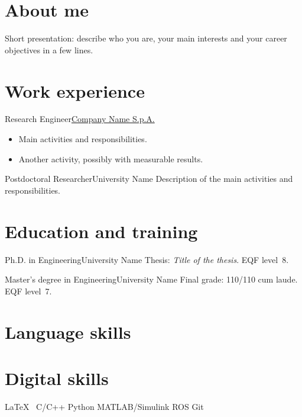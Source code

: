 \documentclass[english,a4paper,10pt]{europecv2020}
\begin{document}
\ecvpersonalinfo

\section{About me}
Short presentation: describe who you are, your main interests and your
career objectives in a few lines.

\section{Work experience}

  {Research Engineer}{\href{https://www.company.com}{Company Name S.p.A.}}
\begin{itemize}
  \item Main activities and responsibilities.
  \item Another activity, possibly with measurable results.
\end{itemize}

  {Postdoctoral Researcher}{University Name}
Description of the main activities and responsibilities.

\section{Education and training}

  {Ph.D. in Engineering}{University Name}
Thesis: \emph{Title of the thesis}. EQF level~8.

  {Master's degree in Engineering}{University Name}
Final grade: 110/110 cum laude. EQF level~7.

\section{Language skills}

\ecvlanguageheader{}
\ecvlanguagefooter{}

\section{Digital skills}
\LaTeX\ \textbar{} C/C++ \textbar{} Python \textbar{} MATLAB/Simulink \textbar{} ROS \textbar{} Git
\end{document}
